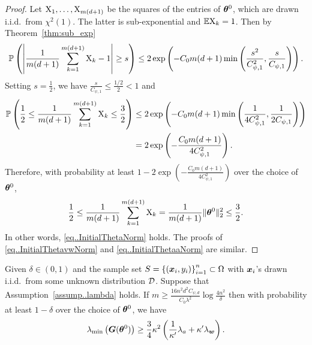 \documentclass[twoside,11pt]{article}
\begin{document}
\begin{proof}
    Let $\textnormal{X}_1, \ldots, \textnormal{X}_{m(d+1)}$ be the squares of the entries of $\bm{\theta}^0$, which are drawn i.i.d.\ from $\chi^2(1)$. The latter is sub-exponential and $\mathbb{E}\textnormal{X}_k=1$. Then by Theorem~\ref{thm:sub_exp}
              \begin{equation*}
                  \mathbb{P}\left(\left\lvert\frac{1}{m(d+1)}\sum_{k=1}^{m(d+1)}\textnormal{X}_k-1\right\rvert\geq s\right)\leq 2\exp\left(-C_0 m(d+1) \min\left(\frac{s^2}{C^2_{\psi,1}},\frac{s}{C_{\psi,1}}\right)\right).
              \end{equation*}
              Setting $s=\frac{1}{2}$, we have $\frac{s}{C_{\psi,1}}\leq \frac{1/2}{2}< 1$ and
              \begin{equation*}
                  \begin{aligned}
                      \mathbb{P}\left(\frac{1}{2}\leq\frac{1}{m(d+1)}\sum_{k=1}^{m(d+1)}\textnormal{X}_k\leq\frac{3}{2}\right)
                       & \leq 2\exp\left(-C_0 m(d+1) \min\left(\frac{1}{4C^2_{\psi,1}},\frac{1}{2C_{\psi,1}}\right)\right) \\
                       & =2\exp\left(-\frac{C_0m(d+1)}{4C^2_{\psi,1}}\right).
                  \end{aligned}
              \end{equation*}
              Therefore, with probability at least $1-2\exp\left(-\frac{C_0m(d+1)}{4C^2_{\psi,1}}\right)$ over the choice of $\bm{\theta}^0$,
              \begin{equation*}
                  \frac{1}{2}\leq\frac{1}{m(d+1)}\sum_{k=1}^{m(d+1)}\textnormal{X}_k=\frac{1}{m(d+1)}\lVert\bm{\theta}^0\rVert_2^2\leq\frac{3}{2}.
              \end{equation*}
              In other words, \eqref{eq..InitialThetaNorm} holds. The proofs of \eqref{eq..InitialThetavwNorm} and \eqref{eq..InitialThetaaNorm} are similar.
\end{proof}
\begin{lem}\label{lem:lambda_min}
    Given $\delta\in(0,1)$ and the sample set $S = {\{(\bm{x}_i, y_i)\}}_{i=1}^n\subset\Omega$ with $\bm{x}_i$'s drawn i.i.d.\ from some unknown distribution $\mathcal{D}$. Suppose that Assumption~\ref{assump..lambda} holds. If $m\geq\frac{16n^2d^2C_{\psi,d}}{C_0\lambda^2}\log\frac{4n^2}{\delta}$ then with probability at least $1-\delta$ over the choice of $\bm{\theta}^0$, we have
    \begin{equation}
        \lambda_{\min}\left(\bm{G}(\bm{\theta}^0)\right)\geq\frac{3}{4}\kappa^2\left(\frac{1}{\kappa'}\lambda_a+\kappa'\lambda_{\bm{w}}\right).
    \end{equation}
\end{lem}
\end{document}
